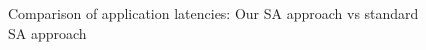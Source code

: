 \begin{figure}[h!]
{    \label{fig:jacl1random}
  }
  \caption{Comparison of application latencies: Our SA approach vs
    standard SA approach}
  \label{fig:stdsa}
\end{figure}



